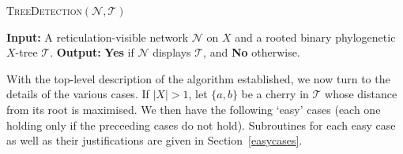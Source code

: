 \documentclass[11pt]{amsart}
\begin{document}
\begin{algorithm}[H]
 \caption{\textsc{TreeDetection}$({{\mathcal N}}, {{\mathcal T}})$}
\begin{algorithmic}[1]
 \Statex\textbf{Input:} A reticulation-visible network ${{\mathcal N}}$ on $X$ and a rooted binary phylogenetic $X$-tree ${{\mathcal T}}$.
 \Statex\textbf{Output:} \textbf{Yes} if ${{\mathcal N}}$ displays ${{\mathcal T}}$, and \textbf{No} otherwise.
      \Else
      \EndIf
      \EndFor
      \EndIf
      \EndFor
      \EndIf
      \EndFor
       \EndIf
      \EndIf
 \end{algorithmic}
\end{algorithm}

With the top-level description of the algorithm established, we now turn to the details of the various cases.
If $|X|>1$, let $\{a, b\}$ be a cherry in ${{\mathcal T}}$ whose distance from its root is maximised. We then have the following `easy' cases (each one holding only if the preceeding cases do not hold). Subroutines for each easy case as well as their justifications are given in Section~\ref{easycases}.
\end{document}
